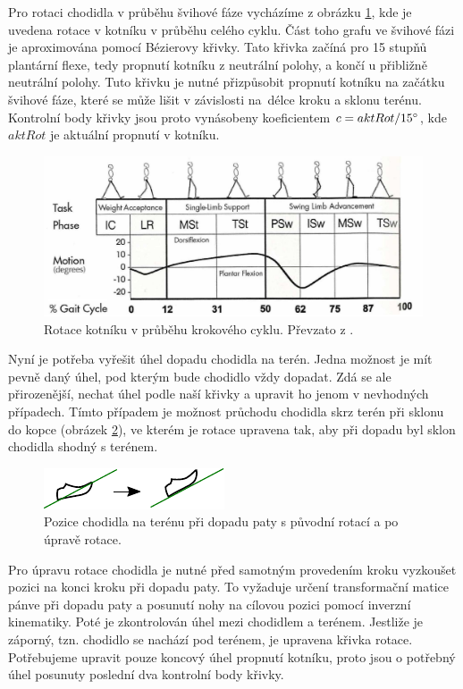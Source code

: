 Pro rotaci chodidla v průběhu švihové fáze vycházíme z obrázku \ref{fig:ankleRot}, kde je uvedena rotace v kotníku v průběhu celého cyklu. Část toho grafu ve švihové fázi je aproximována pomocí Bézierovy křivky. Tato křivka začíná pro 15 stupňů plantární flexe, tedy propnutí kotníku z neutrální polohy, a končí u přibližně neutrální polohy. Tuto křivku je nutné přizpůsobit propnutí kotníku na začátku švihové fáze, které se může lišit v závislosti na~délce kroku a sklonu terénu. Kontrolní body křivky jsou proto vynásobeny koeficientem $c = aktRot / 15\degree$, kde $aktRot$ je aktuální propnutí v kotníku. 

\begin{figure}[h]
	\centering
	\includegraphics[width=0.9\linewidth]{fig/ankle_kinematics.png}
	\caption{Rotace kotníku v průběhu krokového cyklu. Převzato z \cite{biomechanika_chuze}.}
	\label{fig:ankleRot}
\end{figure}

Nyní je potřeba vyřešit úhel dopadu chodidla na terén. Jedna možnost je mít pevně daný úhel, pod kterým bude chodidlo vždy dopadat. Zdá se ale přirozenější, nechat úhel podle naší křivky a upravit ho jenom v nevhodných případech. Tímto případem je možnost průchodu chodidla skrz terén při sklonu do kopce (obrázek \ref{fig:swingRotFix}), ve kterém je rotace upravena tak, aby při dopadu byl sklon chodidla shodný s terénem. 

\begin{figure}[h]
	\centering
	\includegraphics[width=0.6\linewidth]{fig/foot_through_terrain.pdf}
	\caption{Pozice chodidla na terénu při dopadu paty s původní rotací a po úpravě rotace.}
	\label{fig:swingRotFix}
\end{figure}

Pro úpravu rotace chodidla je nutné před samotným provedením kroku vyzkoušet pozici na konci kroku při dopadu paty. To vyžaduje určení transformační matice pánve při dopadu paty a posunutí nohy na cílovou pozici pomocí inverzní kinematiky. Poté je zkontrolován úhel mezi chodidlem a terénem. Jestliže je záporný, tzn. chodidlo se nachází pod terénem, je upravena křivka rotace. Potřebujeme upravit pouze koncový úhel propnutí kotníku, proto jsou o potřebný úhel posunuty poslední dva kontrolní body křivky.

